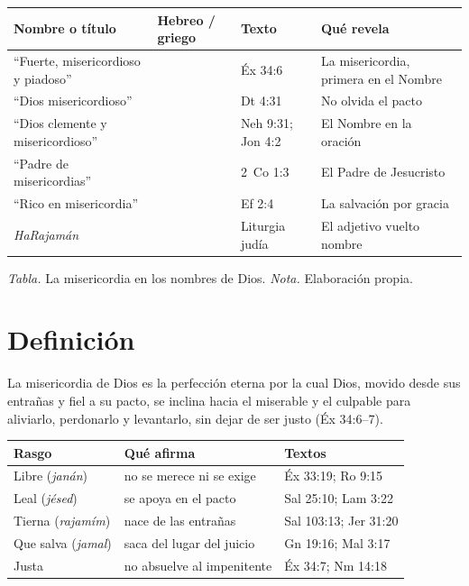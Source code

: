 \begin{center}
\small\renewcommand{\arraystretch}{1.2}
\begin{tabular}{@{}L{4.2cm}L{3.6cm}L{3.0cm}L{4.6cm}@{}}
\toprule
\textbf{Nombre o título} & \textbf{Hebreo / griego} & \textbf{Texto} & \textbf{Qué revela} \\ \midrule
``Fuerte, misericordioso y piadoso'' &  & Éx 34:6 & La misericordia, primera en el Nombre \\
``Dios misericordioso'' &  & Dt 4:31 & No olvida el pacto \\
``Dios clemente y misericordioso'' &  & Neh 9:31; Jon 4:2 & El Nombre en la oración \\
``Padre de misericordias'' &  & 2~Co 1:3 & El Padre de Jesucristo \\
``Rico en misericordia'' &  & Ef 2:4 & La salvación por gracia \\
\emph{HaRajamán} &  & Liturgia judía & El adjetivo vuelto nombre \\ \bottomrule
\end{tabular}\par\smallskip
{\footnotesize\color{gris}\textit{Tabla.} La misericordia en los nombres de Dios. \textit{Nota.} Elaboración propia.}
\end{center}

\section{Definición}

\begin{tcolorbox}[colback=papiro,colframe=azul,boxrule=1pt,arc=3pt,fonttitle=\bfseries,title=Definición]
La misericordia de Dios es la perfección eterna por la cual Dios, movido desde sus entrañas y fiel a su pacto, se inclina hacia el miserable y el culpable para aliviarlo, perdonarlo y levantarlo, sin dejar de ser justo (Éx 34:6--7).
\end{tcolorbox}

\begin{center}\small\renewcommand{\arraystretch}{1.2}
\begin{tabular}{@{}L{3.4cm}L{6.6cm}L{4.4cm}@{}}
\toprule
\textbf{Rasgo} & \textbf{Qué afirma} & \textbf{Textos} \\ \midrule
Libre (\emph{janán}) & no se merece ni se exige & Éx 33:19; Ro 9:15 \\
Leal (\emph{jésed}) & se apoya en el pacto & Sal 25:10; Lam 3:22 \\
Tierna (\emph{rajamím}) & nace de las entrañas & Sal 103:13; Jer 31:20 \\
Que salva (\emph{jamal}) & saca del lugar del juicio & Gn 19:16; Mal 3:17 \\
Justa & no absuelve al impenitente & Éx 34:7; Nm 14:18 \\
\bottomrule
\end{tabular}\end{center}


